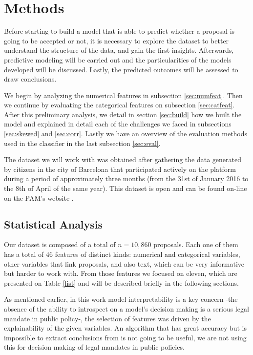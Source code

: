 \chapter{Methods}\label{chap:2}

Before starting to build a model that is able to predict whether a proposal is going to be accepted or not, it is necessary to explore the dataset to better understand the structure of the data, and gain the first insights. Afterwards, predictive modeling will be carried out and the particularities of the models developed will be discussed. Lastly, the predicted outcomes will be assessed to draw conclusions. 

We begin by analyzing the numerical features in subsection \ref{sec:numfeat}. Then we continue by evaluating the categorical features on subsection \ref{sec:catfeat}.  
After this preliminary analysis, we detail in section \ref{sec:build} how we built the model and explained in detail each of the challenges we faced in subsections \ref{sec:skewed} and \ref{sec:corr}. Lastly we have an overview of the evaluation methods used in the classifier in the last subsection \ref{sec:eval}.

The dataset we will work with was obtained after gathering the data generated by citizens in the city of Barcelona that participated actively on the platform during a period of approximately three months (from the 31st of January 2016 to the 8th of April of the same year). This dataset is open and can be found on-line on the PAM's website \cite{pam}. 

                                                   
\section{Statistical Analysis}\label{sec:stat_analysis}
Our dataset is composed of a total of $n=10,860$ proposals. Each one of them has a total of 46 features of distinct kinds: numerical and categorical variables, other variables that link proposals, and also text, which can be very informative but harder to work with. From those features we focused on eleven, which are presented on Table \ref{list} and will be described briefly in the following sections.

As mentioned earlier, in this work model interpretability is a key concern -the absence of the ability to introspect on a model's decision making is a serious legal mandate in public policy-, the selection of features was driven by the explainability of the given variables. An algorithm that has great accuracy but is impossible to extract conclusions from is not going to be useful, we are not using this for decision making of legal mandates in public policies. 
 
